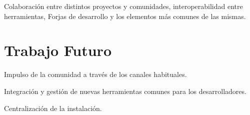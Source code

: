 \documentclass[11pt]{scrartcl}
\begin{document}
\par Colaboraci\'on entre distintos proyectos y comunidades, interoperabilidad entre herramientas, Forjas de desarrollo y los elementos m\'as comunes de las mismas.


\section{Trabajo Futuro}
\label{sec:trabajofuturo}

\par Impulso de la comunidad a través de los canales habituales.

\par Integraci\'on y gesti\'on de nuevas herramientas comunes para los desarrolladores.

\par Centralizaci\'on de la instalaci\'on.

\end{document}
